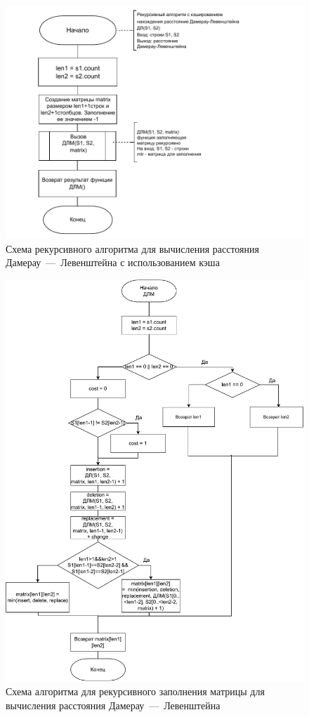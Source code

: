 \begin{figure}[h]
	\centering
	\includegraphics[height=0.6\textheight]{img/recursiveCacheDLevenshtein1.pdf}
	\caption{Схема рекурсивного алгоритма для вычисления расстояния Дамерау~---~Левенштейна с использованием кэша}
	\label{fig:DLrechash1}
\end{figure}

\clearpage

\begin{figure}[h]
	\centering
	\includegraphics[height=0.8\textheight]{img/recursiveCacheDLevenshtein2.pdf}
	\caption{Схема алгоритма для рекурсивного заполнения матрицы для вычисления расстояния Дамерау~---~Левенштейна}
	\label{fig:DLrechash2}
\end{figure}

